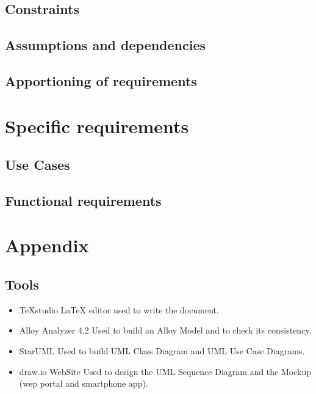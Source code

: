 \documentclass[]{report}
\begin{document}
\section{Constraints}

\section{Assumptions and dependencies}

\section{Apportioning of requirements}

\chapter{Specific requirements}


\section{Use Cases}


\section{Functional requirements}




\appendix
\chapter{Appendix}

\section{Tools}
\begin{itemize}[label=\textbf{\arabic*}]
	\item{TeXstudio} \LaTeX{} editor used to write the document.
	\item{Alloy Analyzer 4.2} Used to build an Alloy Model and to check its consistency.
	\item{StarUML} Used to build UML Class Diagram and UML Use Case Diagrams.
	\item{draw.io WebSite} Used to design the UML Sequence Diagram and the Mockup (wep portal and smartphone app).
	
\end{itemize}
\newpage
\end{document}
